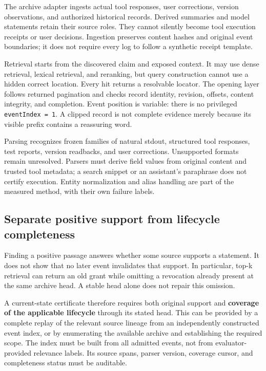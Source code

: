 The archive adapter ingests actual tool responses, user corrections,
version observations, and authorized historical records. Derived
summaries and model statements retain their source roles. They cannot
silently become tool execution receipts or user decisions. Ingestion
preserves content hashes and original event boundaries; it does not
require every log to follow a synthetic receipt template.

Retrieval starts from the discovered claim and exposed context. It may
use dense retrieval, lexical retrieval, and reranking, but query
construction cannot use a hidden correct location. Every hit returns a
resolvable locator. The opening layer follows returned pagination and
checks record identity, revision, offsets, content integrity, and
completion. Event position is variable: there is no privileged
\texttt{eventIndex\ =\ 1}. A clipped record is not complete evidence
merely because its visible prefix contains a reassuring word.

Parsing recognizes frozen families of natural stdout, structured tool
responses, test reports, version readbacks, and user corrections.
Unsupported formats remain unresolved. Parsers must derive field values
from original content and trusted tool metadata; a search snippet or an
assistant's paraphrase does not certify execution. Entity normalization
and alias handling are part of the measured method, with their own
failure labels.

\subsection{Separate positive support from lifecycle
completeness}\label{separate-positive-support-from-lifecycle-completeness}

Finding a positive passage answers whether some source supports a
statement. It does not show that no later event invalidates that
support. In particular, top-k retrieval can return an old grant while
omitting a revocation already present at the same archive head. A stable
head alone does not repair this omission.

A current-state certificate therefore requires both original support and
\textbf{coverage of the applicable lifecycle} through its stated head.
This can be provided by a complete replay of the relevant source lineage
from an independently constructed event index, or by enumerating the
available archive and establishing the required scope. The index must be
built from all admitted events, not from evaluator-provided relevance
labels. Its source spans, parser version, coverage cursor, and
completeness status must be auditable.

